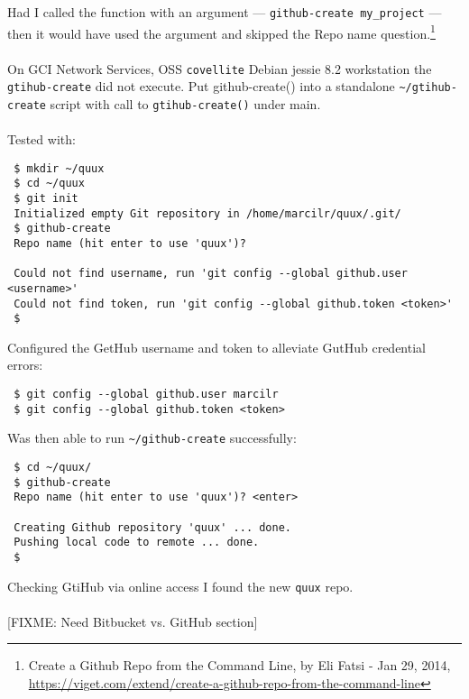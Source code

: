 \documentclass[12pt,letterpaper,dvips]{article}
\newcommand{\FIXME}[1]{\textsf{[FIXME: #1]}}
\newcommand{\cmd}[1]{\texttt{#1}}
\begin{document}
\noindent Had I called the function with an argument — \cmd{github-create my\_project} —
then it would have used the argument and skipped the Repo name question.\footnote{Create a Github Repo
from the Command Line, by Eli Fatsi - Jan 29, 2014,\\
\href{https://viget.com/extend/create-a-github-repo-from-the-command-line}{https://viget.com/extend/create-a-github-repo-from-the-command-line}}
\\
\\
On GCI Network Services, OSS \cmd{covellite} Debian jessie 8.2
workstation the \cmd{gtihub-create} did not execute.  Put
github-create() into a standalone \cmd{\textasciitilde/gtihub-create}
script with call to \cmd{gtihub-create()} under main.
\\
\\
Tested with:
\begin{Verbatim}
 $ mkdir ~/quux
 $ cd ~/quux
 $ git init
 Initialized empty Git repository in /home/marcilr/quux/.git/
 $ github-create 
 Repo name (hit enter to use 'quux')?

 Could not find username, run 'git config --global github.user <username>'
 Could not find token, run 'git config --global github.token <token>'
 $
\end{Verbatim}

\newpage
\noindent Configured the GetHub username and token to alleviate GutHub credential errors:
\begin{Verbatim}
 $ git config --global github.user marcilr
 $ git config --global github.token <token>
\end{Verbatim}

\noindent Was then able to run \cmd{\textasciitilde/github-create} successfully:
\begin{Verbatim}
 $ cd ~/quux/
 $ github-create
 Repo name (hit enter to use 'quux')? <enter>

 Creating Github repository 'quux' ... done.
 Pushing local code to remote ... done.
 $
\end{Verbatim}

\noindent Checking GtiHub via online access I found the new \cmd{quux} repo.
\\
\\
\noindent \FIXME{Need Bitbucket vs. GitHub section}







\end{document}
